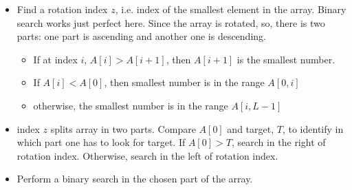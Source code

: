 \begin{itemize}
\item Find a rotation index $z$, i.e. index of the smallest element in the array. Binary search works just perfect here. Since the array is rotated, so, there is two parts: one part is ascending and another one is descending. 
\begin{itemize}
\item If at index $i$, $A[i] > A[i+1]$, then $A[i+1]$ is the smallest number. 
\item If $A[i] < A[0]$, then smallest number is in the range $A[0, i]$
\item otherwise, the smallest number is in the range $A[i, L-1]$
\end{itemize}

\item index $z$ splits array in two parts. Compare $A[0]$ and target, $T$, to identify in which part one has to look for target. If $A[0] > T$, search in the right of rotation index. Otherwise, search in the left of rotation index.

\item Perform a binary search in the chosen part of the array.
\end{itemize}

